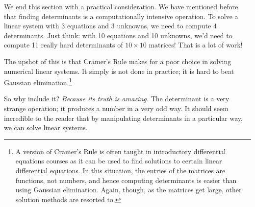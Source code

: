 %
%
%
%
%

We end this section with a practical consideration. We have mentioned before that finding determinants is a computationally intensive operation. To solve a linear system with 3 equations and 3 unknowns, we need to compute 4 determinants. Just think: with 10 equations and 10 unknowns, we'd need to compute 11 really hard determinants of $10\times 10$ matrices! That is a lot of work!

The upshot of this is that Cramer's Rule makes for a poor choice in solving numerical linear systems. It simply is not done in practice; it is hard to beat Gaussian elimination.\footnote{A version of Cramer's Rule is often taught in introductory differential equations courses as it can be used to find solutions to certain linear differential equations. In this situation, the entries of the matrices are functions, not numbers, and hence computing determinants is easier than using Gaussian elimination. Again, though, as the matrices get large, other solution methods are resorted to.}

So why include it? \textit{Because its truth is amazing.} The determinant is a very strange operation; it produces a number in a very odd way. It should seem incredible to the reader that by manipulating determinants in a particular way, we can solve linear systems.


